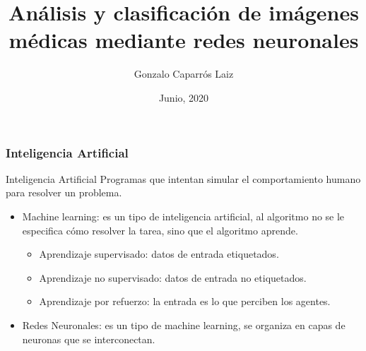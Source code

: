 \documentclass{beamer}
\title[Clasificación de imágenes médicas]{Análisis y clasificación de imágenes médicas mediante redes neuronales} %
\author{Gonzalo Caparrós Laiz} %
\institute[UM] %
{
Universidad de Murcia \\ %
\medskip
\textit{gonzalo.caparrosl@um.es} %
}
\date{Junio, 2020} %
\begin{document}
\begin{frame}
\titlepage %
\end{frame}



\begin{frame}
\frametitle{Inteligencia Artificial}

\begin{block}{Inteligencia Artificial}
Programas que intentan simular el comportamiento humano para resolver un problema.
\end{block}

\begin{itemize}
\item Machine learning: es un tipo de inteligencia artificial, al algoritmo no se le especifica cómo resolver la tarea, sino que el algoritmo aprende.
\begin{itemize}
\item Aprendizaje supervisado: datos de entrada etiquetados.
\item Aprendizaje no supervisado: datos de entrada no etiquetados.
\item Aprendizaje por refuerzo: la entrada es lo que perciben los agentes.
\end{itemize}
\item Redes Neuronales: es un tipo de machine learning, se organiza en capas de neuronas que se interconectan.
\end{itemize}

\end{frame}
\end{document}
